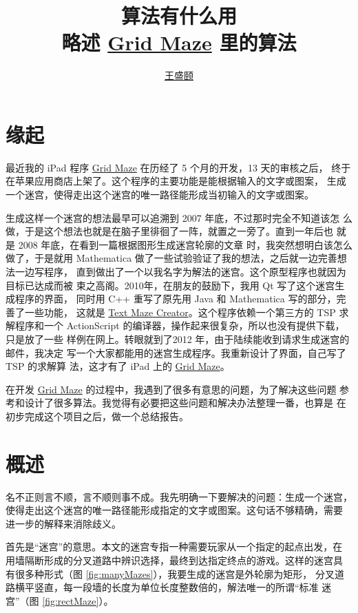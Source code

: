 \documentclass[cs4size,a4paper,adobefonts]{ctexart}
\newcommand{\GridMaze}{\href{http://itunes.apple.com/app/grid-maze/id553265800?mt=8}{Grid Maze}}
\begin{document}
\title{{\bfseries 算法有什么用}\\\large 略述 \GridMaze{} 里的算法}
\author{\href{mailto:txyyss@gmail.com}{王盛颐}}
\date{}
\maketitle

\section*{缘起}
最近我的 iPad 程序 \GridMaze{} 在历经了 5 个月的开发，13 天的审核之后，
终于在苹果应用商店上架了。这个程序的主要功能是能根据输入的文字或图案，
生成一个迷宫，使得走出这个迷宫的唯一路径能形成当初输入的文字或图案。

生成这样一个迷宫的想法最早可以追溯到 2007 年底，不过那时完全不知道该怎
么做，于是这个想法也就是在脑子里徘徊了一阵，就置之一旁了。直到一年后也
就是 2008 年底，在看到一篇根据图形生成迷宫轮廓的文章
\cite{Xu:2007:ImageMaze}时，我突然想明白该怎么做了，于是就用
Mathematica 做了一些试验验证了我的想法，之后就一边完善想法一边写程序，
直到做出了一个以我名字为解法的迷宫。这个原型程序也就因为目标已达成而被
束之高阁。2010年，在朋友的鼓励下，我用 Qt 写了这个迷宫生成程序的界面，
同时用 C++ 重写了原先用 Java 和 Mathematica 写的部分，完善了一些功能，
这就是
\href{https://sites.google.com/site/txyyss/projects/text-maze-creator}{Text
  Maze Creator}。这个程序依赖一个第三方的 TSP 求解程序和一个
ActionScript 的编译器，操作起来很复杂，所以也没有提供下载，只是放了一些
样例在网上。转眼就到了2012 年，由于陆续能收到请求生成迷宫的邮件，我决定
写一个大家都能用的迷宫生成程序。我重新设计了界面，自己写了 TSP 的求解算
法，这才有了 iPad 上的 \GridMaze。

在开发 \GridMaze{} 的过程中，我遇到了很多有意思的问题，为了解决这些问题
参考和设计了很多算法。我觉得有必要把这些问题和解决办法整理一番，也算是
在初步完成这个项目之后，做一个总结报告。

\section{概述}
名不正则言不顺，言不顺则事不成。我先明确一下要解决的问题：生成一个迷宫，
使得走出这个迷宫的唯一路径能形成指定的文字或图案。这句话不够精确，需要
进一步的解释来消除歧义。

首先是“迷宫”的意思。本文的迷宫专指一种需要玩家从一个指定的起点出发，在
用墙隔断形成的分叉道路中辨识选择，最终到达指定终点的游戏。这样的迷宫具
有很多种形式（图 \ref{fig:manyMazes}），我要生成的迷宫是外轮廓为矩形，
分叉道路横平竖直，每一段墙的长度为单位长度整数倍的，解法唯一的所谓“标准
迷宫”（图 \ref{fig:rectMaze}）。
\end{document}
